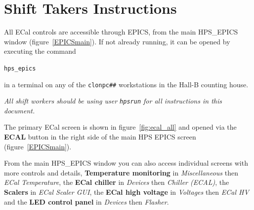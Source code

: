 \documentclass[12pt]{article}
\begin{document}
 \twocolumn
\part{Shift Takers Instructions}

All ECal controls are accessible through EPICS, from the main HPS\_EPICS window (figure~\ref{EPICSmain}).  If not already running, it can be opened by executing
the command \begin{center}\texttt{hps\_epics}\end{center} in a terminal on any of
the \texttt{clonpc\#\#} workstations in the Hall-B counting house.

{\em   All shift workers should be using user \texttt{hpsrun} for all instructions in this document.}

The primary ECal screen is shown in figure~\ref{fig:ecal_all} and opened via the {\bf ECAL} button in the right side of the main HPS EPICS screen (figure~\ref{EPICSmain}).

From the main HPS\_EPICS window you can also access individual screens with more controls and details, {\bf Temperature monitoring} in {\it Miscellaneous} then {\it ECal Temperature}, the {\bf ECal chiller} in {\it Devices} then {\it Chiller (ECAL)}, the {\bf Scalers} in {\it ECal Scaler GUI}, the {\bf ECal high voltage} in {\it Voltages} then {\it ECal HV} and the {\bf LED control panel} in {\it Devices} then {\it Flasher}.  


\end{document}
